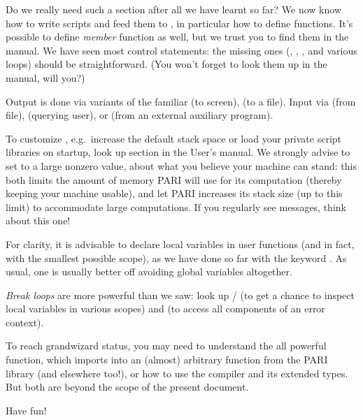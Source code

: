 Do we really need such a section after all we have learnt so far? We now
know how to write scripts and feed them to , in particular how to
define functions. It's possible to define \emph{member} function as well, but
we trust you to find them in the manual. We have seen most control
statements: the missing ones (, , ,
 and various  loops) should be straightforward. (You
won't forget to look them up in the manual, will you?)

Output is done via variants of the familiar  (to screen),
 (to a file). Input via  (from file), 
(querying user), or  (from an external auxiliary program).

To customize , e.g.~increase the default stack space or load your
private script libraries on startup, look up 
section in the User's manual. We strongly advise to set  to
a large nonzero value, about what you believe your machine can stand: this
both limits the amount of memory PARI will use for its computation (thereby
keeping your machine usable), and let PARI increases its stack size (up to
this limit) to accommodate large computations. If you regularly see  messages, think about this one!

For clarity, it is advisable  to declare local variables in user functions
(and in fact, with the smallest possible scope), as we have done so far with
the keyword . As usual, one is usually better off avoiding global
variables altogether.

\emph{Break loops} are more powerful than we saw: look up  /
 (to get a chance to inspect local variables in various scopes)
and  (to access all components of an error context).

To reach grandwizard status, you may need to understand the all powerful
 function, which imports into  an (almost) arbitrary
function from the PARI library (and elsewhere too!), or how to use the
 compiler and its extended types. But both are beyond the scope of
the present document.

Have fun!
\bye
